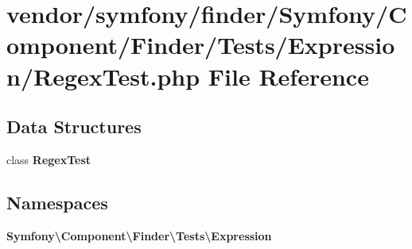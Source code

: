 \section{vendor/symfony/finder/\+Symfony/\+Component/\+Finder/\+Tests/\+Expression/\+Regex\+Test.php File Reference}
\label{symfony_2finder_2_symfony_2_component_2_finder_2_tests_2_expression_2_regex_test_8php}
\subsection*{Data Structures}
\begin{DoxyCompactItemize}
\item 
class {\bf Regex\+Test}
\end{DoxyCompactItemize}
\subsection*{Namespaces}
\begin{DoxyCompactItemize}
\item 
 {\bf Symfony\textbackslash{}\+Component\textbackslash{}\+Finder\textbackslash{}\+Tests\textbackslash{}\+Expression}
\end{DoxyCompactItemize}
